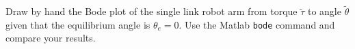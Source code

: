 
Draw by hand the Bode plot of the single link robot arm from torque $\tilde{\tau}$ to angle $\tilde{\theta}$ given that the equilibrium angle is $\theta_e=0$.  Use the Matlab \texttt{bode} command and compare your results.
